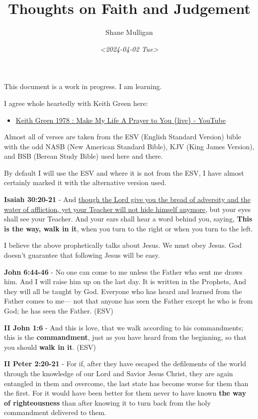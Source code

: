 \documentclass[11pt]{article}
\author{Shane Mulligan}
\date{\textit{<2024-04-02 Tue>}}
\title{Thoughts on Faith and Judgement}
\begin{document}
\maketitle
This document is a work in progress. I am learning.

I agree whole heartedly with Keith Green here:
\begin{itemize}
\item \href{https://www.youtube.com/watch?v=z7oCa9BvO9g}{Keith Green 1978 : Make My Life A Prayer to You \{live\} - YouTube}
\end{itemize}

Almost all of verses are taken from the ESV
(English Standard Version) bible with the odd NASB
(New American Standard Bible), KJV (King
James Version), and BSB (Berean Study Bible) used here and there.

By default I will use the ESV and where it is
not from the ESV, I have almost certainly marked it with the alternative version used.

\textbf{Isaiah 30:20-21} - And \uline{though the Lord give you the bread of adversity and the water of affliction, yet your Teacher will not hide himself anymore}, but your eyes shall see your Teacher. And your ears shall hear a word behind you, saying, \textbf{This is the way, walk in it}, when you turn to the right or when you turn to the left.

I believe the above prophetically talks about Jesus. We must obey Jesus. God doesn't guarantee that following Jesus will be easy.

\textbf{John 6:44-46} - No one can come to me unless the Father who sent me draws him. And I will raise him up on the last day. It is written in the Prophets, And they will all be taught by God. Everyone who has heard and learned from the Father comes to me— not that anyone has seen the Father except he who is from God; he has seen the Father. (ESV)

\textbf{II John 1:6} - And this is love, that we walk according to his commandments; this is the \textbf{commandment}, just as you have heard from the beginning, so that you should \textbf{walk in it}. (ESV)

\textbf{II Peter 2:20-21} - For if, after they have escaped the defilements of the world through the knowledge of our Lord and Savior Jesus Christ, they are again entangled in them and overcome, the last state has become worse for them than the first. For it would have been better for them never to have known \textbf{the way of righteousness} than after knowing it to turn back from the holy commandment delivered to them.
\end{document}
